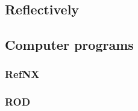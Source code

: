 \subsection{Reflectively}


\lipsum


\subsection{Computer programs}


\lipsum


\subsubsection{RefNX}


\lipsum


\subsubsection{ROD}

\lipsum

